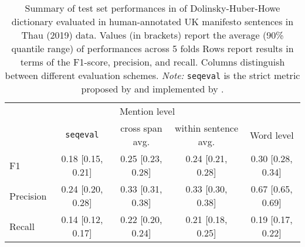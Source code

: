 \begin{table}[!t]

\caption{\label{tab:eval_thau2019-manifestos_all_metrics}Summary of test set performances in of Dolinsky-Huber-Howe dictionary evaluated in human-annotated UK manifesto sentences in Thau (2019) data. Values (in brackets) report the average (90\% quantile range) of performances across 5 folds Rows report results in terms of the F1-score, precision, and recall. Columns distinguish between different evaluation schemes. \emph{Note:} \texttt{seqeval} is the strict metric proposed by \citet{ramshaw_text_1995} and implemented by \citet{nakayama_seqeval_2018}.}
\centering
\fontsize{10}{12}\selectfont
\begin{tabular}[t]{lcccc}
\toprule
\multicolumn{1}{c}{ } & \multicolumn{3}{c}{Mention level} & \multicolumn{1}{c}{ } \\
\cmidrule(l{3pt}r{3pt}){2-4}
 & \texttt{seqeval} & cross span avg. & within sentence avg. & Word level\\
\midrule
F1 & 0.18 [0.15, 0.21] & 0.25 [0.23, 0.28] & 0.24 [0.21, 0.28] & 0.30 [0.28, 0.34]\\
Precision & 0.24 [0.20, 0.28] & 0.33 [0.31, 0.38] & 0.33 [0.30, 0.38] & 0.67 [0.65, 0.69]\\
Recall & 0.14 [0.12, 0.17] & 0.22 [0.20, 0.24] & 0.21 [0.18, 0.25] & 0.19 [0.17, 0.22]\\
\bottomrule
\end{tabular}
\end{table}
